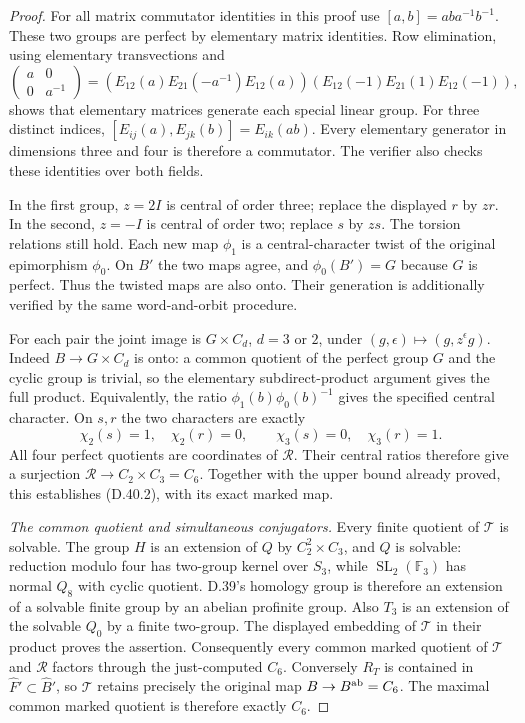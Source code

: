\begin{proof}
For all matrix commutator identities in this proof use
$[a,b]=aba^{-1}b^{-1}$. These two groups are perfect
by elementary matrix identities. Row elimination, using elementary
transvections and
\[
 \begin{pmatrix}a&0\\0&a^{-1}\end{pmatrix}
 =
 \left(E_{12}(a)E_{21}(-a^{-1})E_{12}(a)\right)
 \left(E_{12}(-1)E_{21}(1)E_{12}(-1)\right),
\]
shows that elementary matrices generate each special
linear group. For three distinct indices,
$[E_{ij}(a),E_{jk}(b)]=E_{ik}(ab)$.
Every elementary generator in dimensions three and
four is therefore a commutator. The verifier also
checks these identities over both fields.

In the first group, $z=2I$ is central of order three;
replace the displayed $r$ by $zr$. In the second,
$z=-I$ is central of order two; replace $s$ by $zs$.
The torsion relations still hold. Each new map
$\phi_1$ is a central-character twist of the original
epimorphism $\phi_0$. On $B'$ the two maps agree,
and $\phi_0(B')=G$ because $G$ is perfect. Thus the
twisted maps are also onto. Their generation is
additionally verified by the same word-and-orbit
procedure.

For each pair the joint image is $G\times C_d$,
$d=3$ or $2$, under
$(g,\epsilon)\mapsto(g,z^\epsilon g)$. Indeed
$B\to G\times C_d$ is onto: a common quotient
of the perfect group $G$ and the cyclic group is
trivial, so the elementary subdirect-product argument
gives the full product. Equivalently, the ratio
$\phi_1(b)\phi_0(b)^{-1}$ gives the specified central
character. On $s,r$ the two characters are exactly
\[
 \chi_2(s)=1,\quad\chi_2(r)=0,\qquad
 \chi_3(s)=0,\quad\chi_3(r)=1.                            \tag{D.40.12}
\]
All four perfect quotients are coordinates of
$\mathcal R$. Their central ratios therefore
give a surjection $\mathcal R\to C_2\times C_3=C_6$.
Together with the upper bound already proved, this
establishes (D.40.2), with its exact marked map.

\emph{The common quotient and simultaneous conjugators.}
Every finite quotient of $\mathcal T$ is solvable.
The group $H$ is an extension of $Q$ by
$C_2^2\times C_3$, and $Q$ is solvable: reduction
modulo four has two-group kernel over $S_3$,
while $\operatorname{SL}_2(\mathbb F_3)$ has
normal $Q_8$ with cyclic quotient. D.39's
homology group is therefore an extension of a
solvable finite group by an abelian profinite
group. Also $T_3$ is an extension of the
solvable $Q_0$ by a finite two-group.
The displayed embedding of $\mathcal T$ in
their product proves the assertion.
Consequently every common marked quotient
of $\mathcal T$ and $\mathcal R$ factors through
the just-computed $C_6$. Conversely $R_T$ is
contained in $\widehat F'\subset\widehat B'$, so
$\mathcal T$ retains precisely the original map
$B\to B^{\rm ab}=C_6$. The maximal common marked
quotient is therefore exactly $C_6$.


\end{proof}
